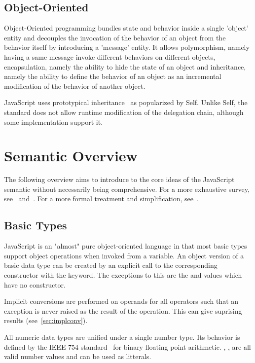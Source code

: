 \subsection{Object-Oriented}

Object-Oriented programming bundles state and behavior inside a single 'object' entity and decouples the invocation of the behavior of an object from the behavior itself by introducing a 'message' entity. It allows polymorphism, namely having a same message invoke different behaviors on different objects, encapsulation, namely the ability to hide the state of an object and inheritance, namely the ability to define the behavior of an object as an incremental modification of the behavior of another object. 

JavaScript uses prototypical inheritance~\cite{Lieberman:1986} as popularized by Self. Unlike Self, the standard does not allow runtime modification of the delegation chain, although some implementation support it.

\section{Semantic Overview}

The following overview aims to introduce to the core ideas of the JavaScript semantic without necessarily being comprehensive. For a more exhaustive survey, see~\cite{Flanagan:2006} and~\cite{ECMA:2009}. For a more formal treatment and simplification, see~\cite{Guha2010}.  

\subsection{Basic Types}

JavaScript is an "almost" pure object-oriented language in that most basic types support object operations when invoked from a variable. An object version of a basic data type can be created by an explicit call to the corresponding constructor with the  keyword.  The exceptions to this are the  and  values which have no constructor. 

Implicit conversions are performed on operands for all operators such that an exception is never raised as the result of the operation. This can give suprising results (see~\ref{sec:implconv}).

All numeric data types are unified under a single number type. Its behavior is defined by the IEEE 754 standard~\cite{IEEE754} for binary floating point arithmetic. , ,  are all valid number values and can be used as litterals.

